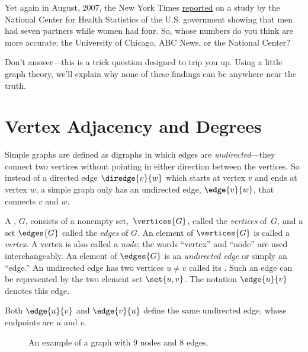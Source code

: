Yet again in August, 2007, the New York Times
\href{http://courses.csail.mit.edu/6.042/spring13/The-Myth-the-Math-the-Sex.pdf}{reported} \iffalse
\href{http://www.nytimes.com/2007/08/12/weekinreview/12kolata.html?_r=1&n=Top/Reference/Times\%20Topics/People/K/Kolata,\%20Gina&oref=slogin}{reported}
\fi on a study by the National Center for Health Statistics of the
U.S. government showing that men had seven partners while women had
four.  So, whose numbers do you think are more accurate: the
University of Chicago, ABC News, or the National Center?

Don't answer---this is a trick question designed to trip you up.
\iffalse like ``When did you stop beating your wife?''\fi Using a
little graph theory, we'll explain why none of these findings can be
anywhere near the truth.

\section{Vertex Adjacency and Degrees}\label{degreessec}

Simple graphs are defined as digraphs in which edges are
\emph{undirected}---they connect two vertices without pointing
in either direction between the vertices.  So instead of a directed
edge $\diredge{v}{w}$ which starts at vertex $v$ and ends at vertex
$w$, a simple graph only has an undirected edge, $\edge{v}{w}$, that
connects $v$ and $w$.

\begin{definition}\label{simplegraphdef}
  A , $G$, consists of a nonempty
  set,~$\vertices{G}$, called the \emph{vertices}%
 of~$G$, and a set $\edges{G}$ called the 
\emph{edges}%
 of $G$.  An element of
  $\vertices{G}$ is called a \emph{vertex}.  A vertex is also called a
  \emph{node}; the words ``vertex'' and ``node'' are used
  interchangeably.  An element of $\edges{G}$ is an \emph{undirected
    edge} or simply an ``edge.''  An undirected edge has two vertices
  $u\neq v$ called its .  Such an edge can be
  represented by the two element set $\set{u,v}$.  The notation
  $\edge{u}{v}$ denotes this edge.
\end{definition}
Both $\edge{u}{v}$ and $\edge{v}{u}$ define the same undirected edge,
whose endpoints are $u$ and $v$.

\begin{figure}[h]


\caption{An example of a graph with 9 nodes and 8 edges.}

\label{fig:graph-example}

\end{figure}

